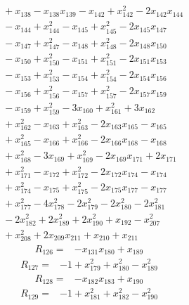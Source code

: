{\begin{align*}
&{}  + x_{138} - x_{138} x_{139} - x_{142} + x_{142}^{2} - 2x_{142} x_{144} \\
&{}  - x_{144} + x_{144}^{2} - x_{145} + x_{145}^{2} - 2x_{145} x_{147} \\
&{}  - x_{147} + x_{147}^{2} - x_{148} + x_{148}^{2} - 2x_{148} x_{150} \\
&{}  - x_{150} + x_{150}^{2} - x_{151} + x_{151}^{2} - 2x_{151} x_{153} \\
&{}  - x_{153} + x_{153}^{2} - x_{154} + x_{154}^{2} - 2x_{154} x_{156} \\
&{}  - x_{156} + x_{156}^{2} - x_{157} + x_{157}^{2} - 2x_{157} x_{159} \\
&{}  - x_{159} + x_{159}^{2} - 3x_{160} + x_{161}^{2} + 3x_{162} \\
&{}  + x_{162}^{2} - x_{163} + x_{163}^{2} - 2x_{163} x_{165} - x_{165} \\
&{}  + x_{165}^{2} - x_{166} + x_{166}^{2} - 2x_{166} x_{168} - x_{168} \\
&{}  + x_{168}^{2} - 3x_{169} + x_{169}^{2} - 2x_{169} x_{171} + 2x_{171} \\
&{}  + x_{171}^{2} - x_{172} + x_{172}^{2} - 2x_{172} x_{174} - x_{174} \\
&{}  + x_{174}^{2} - x_{175} + x_{175}^{2} - 2x_{175} x_{177} - x_{177} \\
&{}  + x_{177}^{2} - 4x_{178}^{2} - 2x_{179}^{2} - 2x_{180}^{2} - 2x_{181}^{2} \\
&{}  - 2x_{182}^{2} + 2x_{189}^{2} + 2x_{190}^{2} + x_{192} - x_{207}^{2} \\
&{}  + x_{208}^{2} + 2x_{209} x_{211} + x_{210} + x_{211}
\end{align*}
\begin{align*}
R_{126} ={}& -x_{131} x_{180} + x_{189}
\end{align*}
\begin{align*}
R_{127} ={}& -1 + x_{179}^{2} + x_{180}^{2} - x_{189}^{2}
\end{align*}
\begin{align*}
R_{128} ={}& -x_{182} x_{183} + x_{190}
\end{align*}
\begin{align*}
R_{129} ={}& -1 + x_{181}^{2} + x_{182}^{2} - x_{190}^{2}
\end{align*}
\begin{align*}

\end{align*}}
